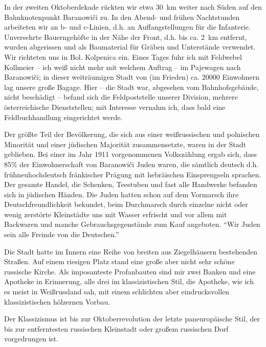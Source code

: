 \documentclass[a5paper,pagesize,10pt,twoside=true]{scrbook}
\begin{document}
In der zweiten Oktoberdekade rückten wir etwa 30~km weiter nach Süden auf den Bahnknotenpunkt Baranowiči zu. In den Abend- und frühen Nachtstunden arbeiteten wir an b- und c-Linien, d.h. an Auffangstellungen für die Infanterie. Unversehrte Bauerngehöfte in der Nähe der Front, d.h. bis ca. 2~km entfernt, wurden abgerissen und als Baumaterial für Gräben und Unterstände verwendet. Wir richteten uns in Bol. Kolpenica ein. Eines Tages fuhr ich mit Feldwebel Kollmeier -- ich weiß nicht mehr mit welchem Auftrag -- im Pajewagen nach Baranowiči; in dieser weiträumigen Stadt von (im Frieden) ca. \num{20000} Einwohnern lag unsere große Bagage. Hier -- die Stadt war, abgesehen vom Bahnhofsgebäude, nicht beschädigt -- befand sich die Feldpoststelle unserer Division, mehrere österreichische Dienststellen; mit Interesse vernahm ich, dass bald eine Feldbuchhandlung eingerichtet werde.

Der größte Teil der Bevölkerung, die sich aus einer weißrussischen und polnischen Minorität und einer jüdischen Majorität zusammensetzte, waren in der Stadt geblieben. Bei einer im Jahr 1911 vorgenommenen Volkszählung ergab sich, dass 85\% der Einwohnerschaft von Baranowiči Juden waren, die sämtlich deutsch d.h. frühneuhochdeutsch fränkischer Prägung mit hebräischen Einsprengseln sprachen. Der gesamte Handel, die Schenken, Teestuben und fast alle Handwerke befanden sich in jüdischen Händen. Die Juden hatten schon auf dem Vormarsch ihre Deutschfreundlichkeit bekundet, beim Durchmarsch durch einzelne nicht oder wenig zerstörte Kleinstädte uns mit Wasser erfrischt und vor allem mit Backwaren und manche Gebrauchsgegenstände zum Kauf angeboten. \enquote{Wir Juden sein alle Freinde von die Deutschen.}

Die Stadt hatte im Innern eine Reihe von breiten aus Ziegelhäusern bestehenden Straßen. Auf einem riesigen Platz stand eine große aber nicht sehr schöne russische Kirche. Als imposanteste Profanbauten sind mir zwei Banken und eine Apotheke in Erinnerung, alle drei im klassizistischen Stil, die Apotheke, wie ich es meist in Weißrussland sah, mit einem schlichten aber eindrucksvollen klassizistischen hölzernen Vorbau.

Der Klassizismus ist bis zur Oktoberrevolution der letzte paneuropäische Stil, der bis zur entferntesten russischen Kleinstadt oder großem russischen Dorf vorgedrungen ist.
\end{document}
